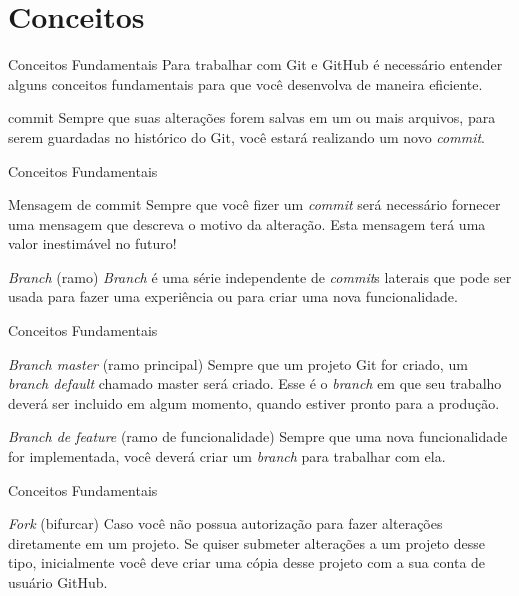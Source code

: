 \documentclass{beamer}
\begin{document}
\section{Conceitos}
\begin{frame}{Conceitos Fundamentais}
  Para trabalhar com Git e GitHub é necessário entender alguns conceitos 
fundamentais para que você desenvolva de maneira eficiente.
\begin{block}{commit}
 Sempre que suas alterações forem salvas em um ou mais arquivos, para serem 
guardadas no histórico do Git, você estará realizando um novo \textit{commit}.
\end{block}

\end{frame}
\begin{frame}{Conceitos Fundamentais}
\begin{block}{Mensagem de commit}
 Sempre que você fizer um \textit{commit} será necessário fornecer uma mensagem 
que descreva o motivo da alteração. Esta mensagem terá uma valor inestimável no 
futuro!
\end{block}
\begin{block}{\textit{Branch} (ramo)}
  \textit{Branch} é uma série independente de \textit{commit}s laterais que 
pode ser usada para fazer uma experiência ou para criar uma nova funcionalidade.
\end{block}
\end{frame}
\begin{frame}{Conceitos Fundamentais}
\begin{block}{\textit{Branch master}  (ramo principal)}
  Sempre que um projeto Git for criado, um \textit{branch default} chamado 
master será criado. Esse é o \textit{branch} em que seu trabalho deverá ser 
incluido em algum momento, quando estiver pronto para a produção.
\end{block}
\begin{block}{\textit{Branch de feature} (ramo de funcionalidade)}
  Sempre que uma nova funcionalidade for implementada, você deverá criar um 
\textit{branch} para trabalhar com ela.
\end{block}
\end{frame}
\begin{frame}{Conceitos Fundamentais}
\begin{block}{\textit{Fork}  (bifurcar)}
  Caso você não possua autorização para fazer alterações diretamente em um 
projeto. Se quiser submeter alterações a um projeto desse tipo, inicialmente 
você deve criar uma cópia desse projeto com a sua conta de usuário GitHub.
\end{block}
\end{frame}
\end{document}
